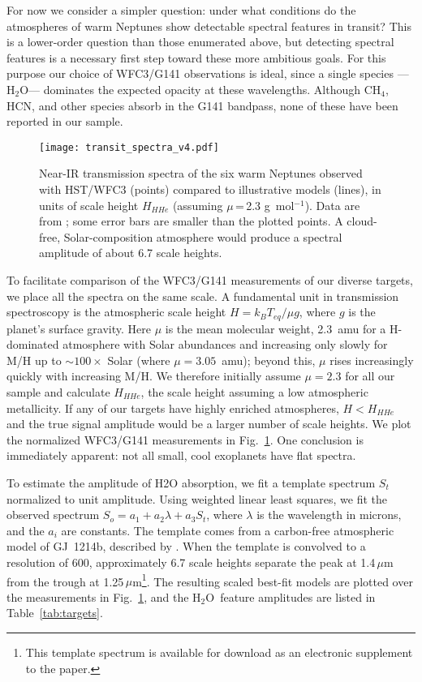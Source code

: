 \documentclass[twocolumn]{aastex61}
\newcommand{\water}{H$_2$O}
\newcommand{\methane}{CH$_4$}
\begin{document}
For now we consider a simpler question: under what conditions do the atmospheres of warm Neptunes show detectable spectral features in transit? This is a lower-order question than those enumerated above, but detecting spectral features is a necessary first step toward these more ambitious goals. For this purpose our choice of WFC3/G141 observations is ideal, since  a single species --- \water --- dominates the expected opacity at these wavelengths. Although \methane, HCN, and other species  absorb in the G141 bandpass,  none of these have been reported in our sample. 

\begin{figure}
\texttt{[image: transit\_spectra\_v4.pdf]}
\caption{Near-IR transmission spectra of the six warm Neptunes
  observed with HST/WFC3 (points) compared to illustrative models
  (lines), in units of scale height $H_{HHe}$ (assuming $\mu$\,=\,2.3
  g~mol$^{-1}$).  Data are from
  \cite[][]{fraine:2014,knutson:2014a,knutson:2014b,kreidberg:2014,wakeford:2017};
  some error bars are smaller than the plotted
  points. A cloud-free, Solar-composition atmosphere would produce a spectral amplitude of about 6.7 scale heights.\label{fig:spectra}}
\end{figure}


To facilitate comparison of the WFC3/G141 measurements of our diverse targets, we place all the spectra on the same scale. A fundamental unit in transmission spectroscopy is the atmospheric scale height $H= k_B T_{eq} / \mu g$, where $g$ is the planet's surface gravity. Here $\mu$ is the mean molecular weight, 2.3~amu for a H-dominated atmosphere with Solar abundances and  increasing only slowly for M/H up to $\sim100\times$ Solar (where $\mu=3.05$~amu); beyond this, $\mu$ rises increasingly quickly with increasing M/H.  We therefore initially assume $\mu=2.3$ for all our sample and calculate $H_{HHe}$, the scale height assuming a low atmospheric metallicity.  If any of our targets have highly enriched atmospheres, $H < H_{HHe}$ and the true signal amplitude would be a larger number of scale heights. We plot the normalized WFC3/G141 measurements  in Fig.~\ref{fig:spectra}. One conclusion is immediately apparent: not all small, cool exoplanets have flat spectra.

To estimate the amplitude of H2O absorption, we fit a template spectrum $S_t$ normalized to unit amplitude. Using weighted linear least squares, we fit the observed spectrum $S_o = a_1+ a_2\lambda + a_3 S_t$, where $\lambda$ is the wavelength in microns, and the $a_i$ are constants.  The template comes from a carbon-free atmospheric model of GJ~1214b, described by \cite{crossfield:2011}. When the template is convolved to a resolution of 600, approximately 6.7 scale heights separate the peak at 1.4\,$\mu$m from the trough at 1.25\,$\mu$m\footnote{This template spectrum is available for download as an electronic supplement to the paper.}. The resulting scaled best-fit models are plotted over the measurements in Fig.~\ref{fig:spectra}, and the
\water\ feature amplitudes are listed in Table~\ref{tab:targets}.
\end{document}
